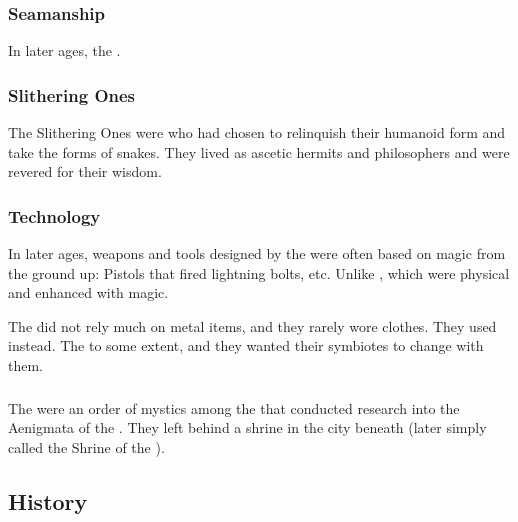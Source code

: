 \subsubsection{Seamanship}
In later ages, the \quiljaaran{} . 





\subsubsection{Slithering Ones}
The Slithering Ones were \caisith who had chosen to relinquish their humanoid form and take the forms of snakes.
They lived as ascetic hermits and philosophers and were revered for their wisdom. 





\subsubsection{Technology}
In later ages, weapons and tools designed by the \quiljaaran{} were often based on magic from the ground up: 
Pistols that fired lightning bolts, etc. 
Unlike , which were physical and enhanced with magic. 

The \quiljaaran did not rely much on metal items, and they rarely wore clothes.
They used  instead. 
The \quiljaaran {} to some extent, and they wanted their symbiotes to change with them. 





\subsubsection{\UzulKaya}
The \UzulKaya were an order of mystics among the \ophidians that conducted research into the Aenigmata of the \xss. 
They left behind a shrine in the city beneath \Yormis (later simply called the Shrine of the \UzulKaya). 









\subsection{History}

